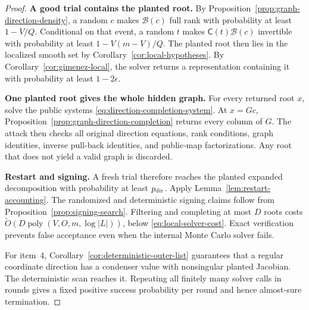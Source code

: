\documentclass[11pt,a4paper]{article}
\theoremstyle{definition}
\theoremstyle{remark}
\newcommand{\proofstep}[1]{\par\smallskip\noindent\textbf{#1}\enspace}
\begin{document}
\begin{proof}
\proofstep{A good trial contains the planted root.}
By Proposition~\ref{prop:graph-direction-density}, a random $c$ makes $\mathcal B(c)$ full rank with probability at least $1-V/Q$.  Conditional on that event, a random $t$ makes $\mathsf C(t)\mathcal B(c)$ invertible with probability at least $1-V(m-V)/Q$.  The planted root then lies in the localized smooth set by Corollary~\ref{cor:local-hypotheses}.  By Corollary~\ref{cor:gimenez-local}, the solver returns a representation containing it with probability at least $1-2\epsilon$.

\proofstep{One planted root gives the whole hidden graph.}
For every returned root $x$, solve the public systems \eqref{eq:direction-completion-system}.  At $x=Gc$, Proposition~\ref{prop:graph-direction-completion} returns every column of $G$.  The attack then checks all original direction equations, rank conditions, graph identities, inverse pull-back identities, and public-map factorizations.  Any root that does not yield a valid graph is discarded.

\proofstep{Restart and signing.}
A fresh trial therefore reaches the planted expanded decomposition with probability at least $p_{\rm dir}$.  Apply Lemma~\ref{lem:restart-accounting}.  The randomized and deterministic signing claims follow from Proposition~\ref{prop:signing-search}.  Filtering and completing at most $D$ roots costs $\widetilde O(D\operatorname{poly}(V,O,m,\log|L|))$, below \eqref{eq:local-solver-cost}.  Exact verification prevents false acceptance even when the internal Monte Carlo solver fails.

For item~4, Corollary~\ref{cor:deterministic-outer-list} guarantees that a regular coordinate direction has a condenser value with nonsingular planted Jacobian.  The deterministic scan reaches it.  Repeating all finitely many solver calls in rounds gives a fixed positive success probability per round and hence almost-sure termination.
\end{proof}
\end{document}
